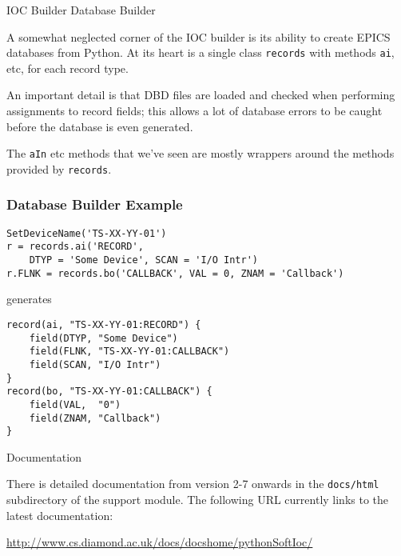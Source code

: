 \documentclass{beamer}
\begin{document}
%
\begin{frame}{IOC Builder Database Builder}

A somewhat neglected corner of the IOC builder is its ability to create EPICS
databases from Python.  At its heart is a single class \texttt{records} with
methods \texttt{ai}, etc, for each record type.

\medskip

An important detail is that DBD files are loaded and checked when performing
assignments to record fields; this allows a lot of database errors to be caught
before the database is even generated.

\medskip

The \texttt{aIn} etc methods that we've seen are mostly wrappers around the
methods provided by \texttt{records}.

\end{frame}


%
\begin{frame}[fragile]\frametitle{Database Builder Example}

\lstset{language=Python}
\begin{lstlisting}
SetDeviceName('TS-XX-YY-01')
r = records.ai('RECORD',
    DTYP = 'Some Device', SCAN = 'I/O Intr')
r.FLNK = records.bo('CALLBACK', VAL = 0, ZNAM = 'Callback')
\end{lstlisting}

generates

\lstset{language=}
\begin{lstlisting}
record(ai, "TS-XX-YY-01:RECORD") {
    field(DTYP, "Some Device")
    field(FLNK, "TS-XX-YY-01:CALLBACK")
    field(SCAN, "I/O Intr")
}
record(bo, "TS-XX-YY-01:CALLBACK") {
    field(VAL,  "0")
    field(ZNAM, "Callback")
}
\end{lstlisting}

\end{frame}


%
\begin{frame}{Documentation}

There is detailed documentation from version 2-7 onwards in the
\texttt{docs/html} subdirectory of the support module.  The following URL
currently links to the latest documentation:

\medskip

\footnotesize
\url{http://www.cs.diamond.ac.uk/docs/docshome/pythonSoftIoc/}

\end{frame}
\end{document}
